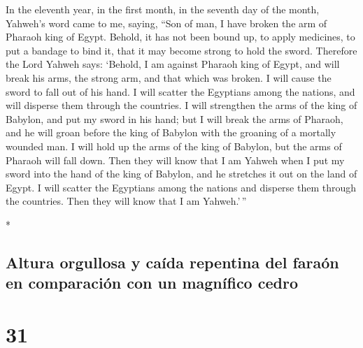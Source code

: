 \begin{paracol}{2}
\begin{otherlanguage}{english}
 In the eleventh year, in the first month, in the seventh
day of the month, Yahweh's word came to me, saying, 
``Son of man, I have broken the arm of Pharaoh king of Egypt. Behold, it
has not been bound up, to apply medicines, to put a bandage to bind it,
that it may become strong to hold the sword.  Therefore
the Lord Yahweh says: `Behold, I am against Pharaoh king of Egypt, and
will break his arms, the strong arm, and that which was broken. I will
cause the sword to fall out of his hand.  I will scatter
the Egyptians among the nations, and will disperse them through the
countries.  I will strengthen the arms of the king of
Babylon, and put my sword in his hand; but I will break the arms of
Pharaoh, and he will groan before the king of Babylon with the groaning
of a mortally wounded man.  I will hold up the arms of
the king of Babylon, but the arms of Pharaoh will fall down. Then they
will know that I am Yahweh when I put my sword into the hand of the king
of Babylon, and he stretches it out on the land of Egypt.
 I will scatter the Egyptians among the nations and
disperse them through the countries. Then they will know that I am
Yahweh.'\,''

\end{otherlanguage}

\switchcolumn[0]*

\hypertarget{altura-orgullosa-y-cauxedda-repentina-del-farauxf3n-en-comparaciuxf3n-con-un-magnuxedfico-cedro}{%
\subsection{Altura orgullosa y caída repentina del faraón en comparación
con un magnífico
cedro}\label{altura-orgullosa-y-cauxedda-repentina-del-farauxf3n-en-comparaciuxf3n-con-un-magnuxedfico-cedro}}

\hypertarget{section-60}{%
\section{31}\label{section-60}}


\end{paracol}
